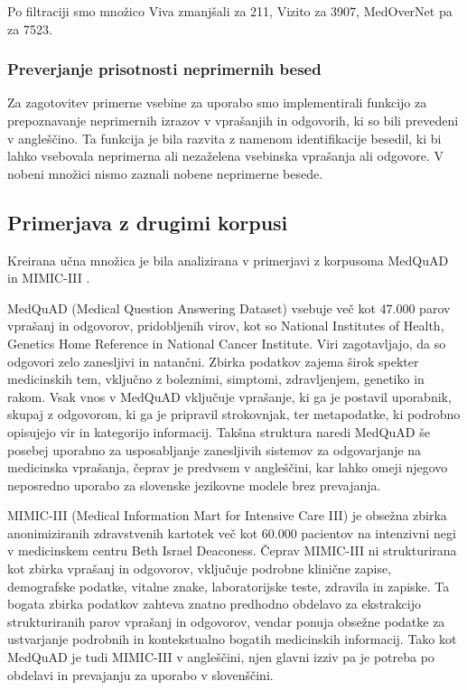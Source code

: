 \documentclass[fleqn,moreauthors,10pt]{ds_report}
\begin{document}
Po filtraciji smo množico Viva zmanjšali za 211, Vizito za 3907, MedOverNet pa za 7523.

\subsubsection*{Preverjanje prisotnosti neprimernih besed}
Za zagotovitev primerne vsebine za uporabo smo implementirali funkcijo za prepoznavanje neprimernih izrazov v v\-pra\-šan\-jih in odgovorih, ki so bili prevedeni v angleščino. Ta funkcija je bila razvita z namenom identifikacije besedil, ki bi lahko vsebovala neprimerna ali nezaželena vsebinska vprašanja ali odgovore. V nobeni množici nismo zaznali nobene neprimerne besede.


\subsection*{Primerjava z drugimi korpusi}
Kreirana učna množica je bila analizirana v primerjavi z korpusoma MedQuAD \cite{BenAbacha-BMC-2019} in MIMIC-III \cite{johnson2018mimic}.

MedQuAD (Medical Question Answering Dataset) vsebuje več kot 47.000 parov vprašanj in odgovorov, pridobljenih virov, kot so National Institutes of Health, Genetics Home Reference in National Cancer Institute. Viri zagotavljajo, da so odgovori zelo zanesljivi in natančni. Zbirka podatkov zajema širok spekter medicinskih tem, vključno z boleznimi, simptomi, zdravljenjem, genetiko in rakom. Vsak vnos v MedQuAD vključuje vprašanje, ki ga je postavil uporabnik, skupaj z odgovorom, ki ga je pripravil strokovnjak, ter metapodatke, ki podrobno opisujejo vir in kategorijo informacij. Takšna struktura naredi MedQuAD še posebej uporabno za usposabljanje zanesljivih sistemov za odgovarjanje na medicinska vprašanja, čeprav je predvsem v angleščini, kar lahko omeji njegovo neposredno uporabo za slovenske jezikovne modele brez prevajanja.

MIMIC-III (Medical Information Mart for Intensive Care III) je obsežna zbirka anonimiziranih zdravstvenih kartotek več kot 60.000 pacientov na intenzivni negi v medicinskem centru Beth Israel Deaconess. Čeprav MIMIC-III ni strukturirana kot zbirka vprašanj in odgovorov, vključuje podrobne klinične zapise, demografske podatke, vitalne znake, laboratorijske teste, zdravila in zapiske. Ta bogata zbirka podatkov zahteva znatno predhodno obdelavo za ekstrakcijo strukturiranih parov vprašanj in odgovorov, vendar ponuja obsežne podatke za ustvarjanje podrobnih in kontekstualno bogatih medicinskih informacij. Tako kot MedQuAD je tudi MIMIC-III v angleščini, njen glavni izziv pa je potreba po obdelavi in prevajanju za uporabo v slovenščini.
\end{document}
